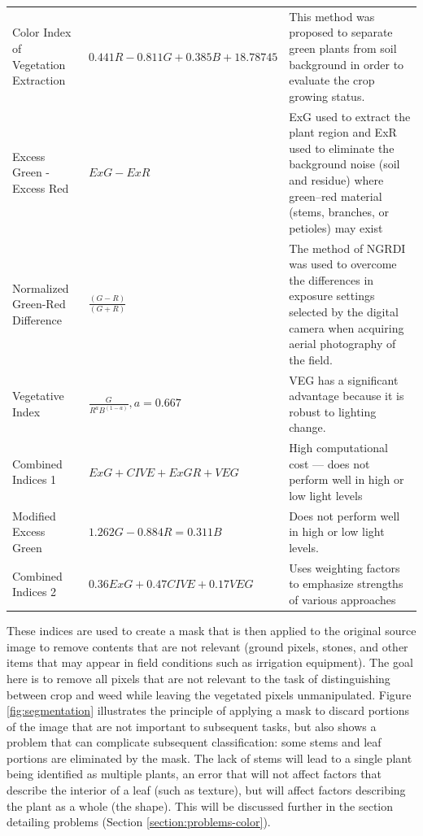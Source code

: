 \documentclass[letterpaper, notitlepage]{report}
\begin{document}
{{\begin{longtable}{x{\dimexpr.25\tabcolsep}
                  x{\dimexpr.35\tabcolsep}
                  x{\dimexpr.4\tabcolsep}}
		Color Index of Vegetation Extraction      
		& $0.441 R - 0.811 G + 0.385 B + 18.78745$
		& This method was proposed to separate green plants from soil background in order to evaluate the crop growing status.
\tabularnewline\addlinespace

		Excess Green - Excess Red   
		& $ExG - ExR$ 
		& ExG used to extract the plant region and ExR used to eliminate the background noise (soil and residue) where green–red material (stems, branches, or petioles) may exist
\tabularnewline\addlinespace

		Normalized Green-Red Difference    
		& $\frac {(G - R)} {(G + R)}$ 
		& The method of NGRDI was used to overcome the differences in exposure settings selected by the digital camera when acquiring aerial photography of the field. 
\tabularnewline\addlinespace

		Vegetative Index      
		& $\frac {G} {R^aB^{(1-a)}}, a = 0.667$ 
		& VEG has a significant advantage because it is robust to lighting change.
\tabularnewline\addlinespace

		Combined Indices 1   
		& $ExG + CIVE + ExGR + VEG$ 
		& High computational cost --- does not perform well in high or low light levels
\tabularnewline\addlinespace

		Modified Excess Green      
		& $1.262G - 0.884R = 0.311B$ 
		& Does not perform well in high or low light levels. 
\tabularnewline\addlinespace

		Combined Indices 2      
		& $0.36ExG + 0.47CIVE + 0.17VEG$ 
		& Uses weighting factors to emphasize strengths of various approaches
\label{table:indices}
\end{longtable}
}

These indices are used to create a mask that is then applied to the original source image to remove contents that are not relevant (ground pixels, stones, and other items that may appear in field conditions such as irrigation equipment). The goal here is to remove all pixels that are not relevant to the task of distinguishing between crop and weed while leaving the vegetated pixels unmanipulated.  Figure \ref{fig:segmentation} illustrates the principle of applying a mask to discard portions of the image that are not important to subsequent tasks, but also shows a problem that can complicate subsequent classification: some stems and leaf portions are eliminated by the mask. The lack of stems will lead to a single plant being identified as multiple plants, an error that will not affect factors that describe the interior of a leaf (such as texture), but will affect factors describing the plant as a whole (the shape). This will be discussed further in the section detailing problems (Section \ref{section:problems-color}).

}
\end{document}
